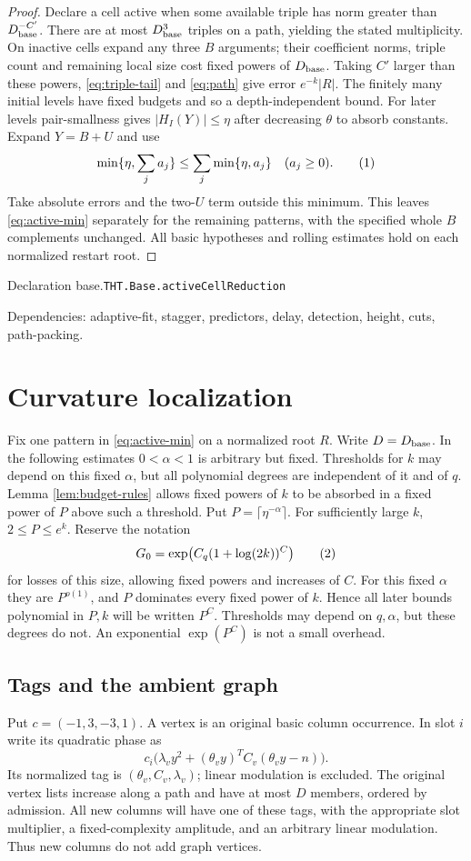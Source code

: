 \documentclass[11pt]{article}
\theoremstyle{definition}
\newcommand{\eqtag}[1]{\refstepcounter{equation}\tag{\theequation}\label{#1}}
\numberwithin{equation}{section}
\newcommand{\bp}[3]{\par\smallskip\begingroup\footnotesize
\noindent\hypertarget{bp:#1}{\textsf{Declaration #1.}}\quad\nolinkurl{#2}\par
\noindent\textsf{Dependencies:} #3.\par\endgroup\smallskip}
\begin{document}
\begin{proof}
Declare a cell active when some available triple has norm greater than $D_{\rm base}^{-C'}$. There are at most $D_{\rm base}^3$ triples on a path, yielding the stated multiplicity. On inactive cells expand any three $B$ arguments; their coefficient norms, triple count and remaining local size cost fixed powers of $D_{\rm base}$. Taking $C'$ larger than these powers, \eqref{eq:triple-tail} and \eqref{eq:path} give error $e^{-k}|R|$. The finitely many initial levels have fixed budgets and so a depth-independent bound. For later levels pair-smallness gives $|H_I(Y)|\le\eta$ after decreasing $\theta$ to absorb constants. Expand $Y=B+U$ and use
\[
 \min\{\eta,\sum_j a_j\}\le\sum_j\min\{\eta,a_j\}\quad(a_j\ge0).
 \eqtag{eq:min-subadd}
\]
Take absolute errors and the two-$U$ term outside this minimum. This leaves \eqref{eq:active-min} separately for the remaining patterns, with the specified whole $B$ complements unchanged. All basic hypotheses and rolling estimates hold on each normalized restart root.
\end{proof}
\bp{base}{THT.Base.activeCellReduction}{adaptive-fit, stagger, predictors, delay, detection, height, cuts, path-packing}




\section{Curvature localization}\label{sec:localization}
Fix one pattern in \eqref{eq:active-min} on a normalized root $R$. Write $D=D_{\rm base}$. In the following estimates $0<\alpha<1$ is arbitrary but fixed. Thresholds for $k$ may depend on this fixed $\alpha$, but all polynomial degrees are independent of it and of $q$. Lemma \ref{lem:budget-rules} allows fixed powers of $k$ to be absorbed in a fixed power of $P$ above such a threshold. Put $P=\lceil\eta^{-\alpha}\rceil$. For sufficiently large $k$, $2\le P\le e^k$. Reserve the notation
\[
 G_0=\exp\bigl(C_q(1+\log(2k))^C\bigr)
 \eqtag{eq:small-overhead}
\]
for losses of this size, allowing fixed powers and increases of $C$. For this fixed $\alpha$ they are $P^{o(1)}$, and $P$ dominates every fixed power of $k$. Hence all later bounds polynomial in $P,k$ will be written $P^C$. Thresholds may depend on $q,\alpha$, but these degrees do not. An exponential $\exp(P^C)$ is not a small overhead.

\subsection{Tags and the ambient graph}
Put $c=(-1,3,-3,1)$. A vertex is an original basic column occurrence. In slot $i$ write its quadratic phase as
\[
 c_i\bigl(\lambda_vy^2+(\theta_vy)^TC_v(\theta_vy-n)\bigr).
\]
Its normalized tag is $(\theta_v,C_v,\lambda_v)$; linear modulation is excluded. The original vertex lists increase along a path and have at most $D$ members, ordered by admission. All new columns will have one of these tags, with the appropriate slot multiplier, a fixed-complexity amplitude, and an arbitrary linear modulation. Thus new columns do not add graph vertices.
\end{document}
